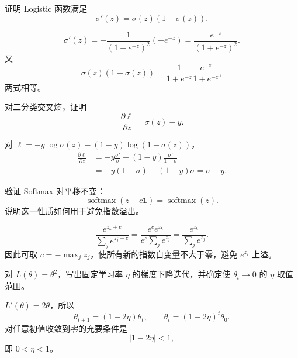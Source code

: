 %
%

\begin{exercise}[level=basic]
证明 Logistic 函数满足
\[
\sigma'(z)=\sigma(z)(1-\sigma(z)).
\]
\begin{solution}
\[
\sigma'(z)
=-\frac{1}{(1+e^{-z})^2}(-e^{-z})
=\frac{e^{-z}}{(1+e^{-z})^2}.
\]
又
\[
\sigma(z)(1-\sigma(z))
=\frac1{1+e^{-z}}\frac{e^{-z}}{1+e^{-z}},
\]
两式相等。
\end{solution}
\end{exercise}

\begin{exercise}[level=basic]
对二分类交叉熵，证明
\[
\frac{\partial\ell}{\partial z}=\sigma(z)-y.
\]
\begin{solution}
对
$\ell=-y\log\sigma(z)-(1-y)\log(1-\sigma(z))$，
\begin{align*}
\frac{\partial\ell}{\partial z}
&=-y\frac{\sigma'}{\sigma}
+(1-y)\frac{\sigma'}{1-\sigma}\\
&=-y(1-\sigma)+(1-y)\sigma
=\sigma-y.
\end{align*}
\end{solution}
\end{exercise}

\begin{exercise}[level=basic]
验证 Softmax 对平移不变：
\[
\operatorname{softmax}(z+c\mathbf1)
=\operatorname{softmax}(z).
\]
说明这一性质如何用于避免指数溢出。
\begin{solution}
\[
\frac{e^{z_k+c}}{\sum_je^{z_j+c}}
=\frac{e^ce^{z_k}}{e^c\sum_je^{z_j}}
=\frac{e^{z_k}}{\sum_je^{z_j}}.
\]
因此可取 $c=-\max_jz_j$，使所有新的指数自变量不大于零，避免 $e^{z_j}$ 上溢。
\end{solution}
\end{exercise}

\begin{exercise}[level=basic]
对 $L(\theta)=\theta^2$，写出固定学习率 $\eta$ 的梯度下降迭代，并确定使 $\theta_t\to0$ 的 $\eta$ 取值范围。
\begin{solution}
$L'(\theta)=2\theta$，所以
\[
\theta_{t+1}=(1-2\eta)\theta_t,
\qquad
\theta_t=(1-2\eta)^t\theta_0.
\]
对任意初值收敛到零的充要条件是
\[
|1-2\eta|<1,
\]
即 $0<\eta<1$。
\end{solution}
\end{exercise}

